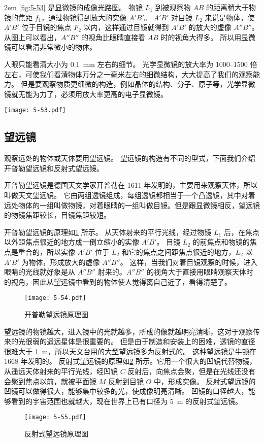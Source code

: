 \medskip\noindent
\begin{minipage}{0.62\linewidth}\parindent2em
\cref{fig:5-53} 是显微镜的成像光路图。
物镜 $L_1$ 到被观察物 $AB$ 的距离稍大于物镜的焦距 $f_1$，通过物镜得到放大的实像 $A'B'$。
$A'B'$ 对目镜 $L_2$ 来说是物体，使 $A'B'$ 位于目镜的焦点 $F_2$ 以内，这样通过目镜就得到 $A'B'$ 的放大的虚像 $A''B''$。
从图上可以看出，$A''B''$ 的视角比眼睛直接看 $AB$ 时的视角大得多。
所以用显微镜可以看清非常微小的物体。

人眼只能看清大小为 \qty{0.1}{mm} 左右的细节。
光学显微镜的放大率为 \numrange{1000}{1500} 倍左右，可使我们看清物体万分之一毫米左右的细微结构，大大提高了我们的观察能力。
但是要观察物质更细微的构造，例如晶体的结构、分子、原子等，光学显微镜就无能为力了，必须用放大率更高的电子显微镜。
\end{minipage}\hfill
\begin{minipage}{0.33\linewidth}
  \begin{figurehere}
    \texttt{[image: 5-53.pdf]}
    \caption{显微镜的成像光路图}\label{fig:5-53}
  \end{figurehere}
\end{minipage}\par\medskip

\subsection{望远镜}
观察远处的物体或天体要用望远镜。
望远镜的构造有不同的型式，下面我们介绍开普勒望远镜和反射式望远镜。

开普勒望远镜是德国天文学家开普勒在 1611 年发明的，主要用来观察天体，所以叫做天文望远镜。
它由两组透镜组成，每组透镜都相当于一个凸透镜，其中对着远处物体的一组叫做物镜，对着眼睛的一组叫做目镜。但是跟显微镜相反，望远镜的物镜焦距较长，目镜焦距较短。

开普勒望远镜的原理如\cref{fig:5-54} 所示。
从天体射来的平行光线，经过物镜 $L_1$ 后，在焦点以外距焦点很近的地方成一倒立缩小的实像 $A'B'$。
目镜 $L_2$ 的前焦点和物镜的焦点是重合的，所以实像 $A'B'$ 位于 $L_2$ 和它的焦点之间距焦点很近的地方，$L_2$ 以 $A'B'$ 为物体，形成放大的虚像 $A''B''$。
这样，当我们对着目镜观察的时候，进入眼睛的光线就好象是从 $A''B''$ 射来的。$A''B''$ 的视角大于直接用眼睛观察天体时的视角，因此从望远镜中看到的物体使人觉得离自己近了，看得清楚了。
\begin{figure}
  \texttt{[image: 5-54.pdf]}
  \caption{开普勒望远镜原理图}\label{fig:5-54}
\end{figure}

望远镜的物镜越大，进入镜中的光就越多，所成的像就越明亮清晰，这对于观察传来的光很弱的遥远星体是很重要的。
但是由于制造和安装上的困难，透镜的直径很难大于 \qty{1}{m}，所以天文台用的大型望远镜多为反射式的。
这种望远镜是牛顿在 1668 年发明的。
反射式望远镜的原理如\cref{fig:5-55} 所示。它用一个很大的凹镜代替物镜，从遥远天体射来的平行光线，经凹镜 $C$ 反射后，向焦点会聚，但是在光线还没有会聚到焦点以前，就被平面镜 $M$ 反射到目镜 $O$ 中，形成实像。
反射式望远镜的凹镜可以做得很大，能够集中较多的光，使成像明亮清晰。
凹镜的口径越大，能够看到的宇宙范围也就越大，现在世界上已有口径为 \qty{5}{m} 的反射式望远镜。
\begin{figure}
  \texttt{[image: 5-55.pdf]}
  \caption{反射式望远镜原理图}\label{fig:5-55}
\end{figure}

